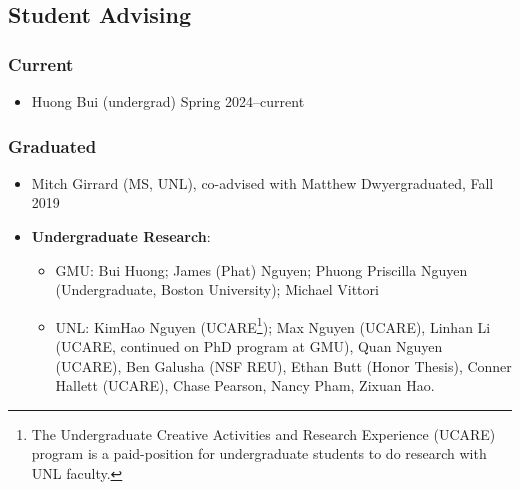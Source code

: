 \documentclass[11pt]{article}
\begin{document}
{
  \subsection{Student Advising}
  
  \subsubsection{Current}
  \begin{itemize}
    \nguyenkhoi{}
    \haiduong{}
    \linhan{}
    \didier{}
    \item Huong Bui (undergrad) \hfill Spring 2024--current

  \end{itemize}

  \subsubsection{Graduated}
  \begin{itemize}
    \kimhao{}
    \guolong{}
    \alex{}
  \item Mitch Girrard (MS, UNL), co-advised with Matthew Dwyer\hfill graduated, Fall 2019
    
  \item \textbf{Undergraduate Research}:
    \begin{itemize}
    \item GMU: Bui Huong; James (Phat) Nguyen; Phuong Priscilla Nguyen (Undergraduate, Boston University); Michael Vittori
    \item UNL: KimHao Nguyen (UCARE\footnote{The Undergraduate Creative Activities and Research Experience (UCARE) program is a paid-position for undergraduate students to do research with UNL faculty.}); Max Nguyen (UCARE), Linhan Li (UCARE, continued on PhD program at GMU), Quan Nguyen (UCARE), Ben Galusha (NSF REU), Ethan Butt (Honor Thesis), Conner Hallett (UCARE), Chase Pearson, Nancy Pham, Zixuan Hao.
  \end{itemize}
  \end{itemize}
}
\end{document}
